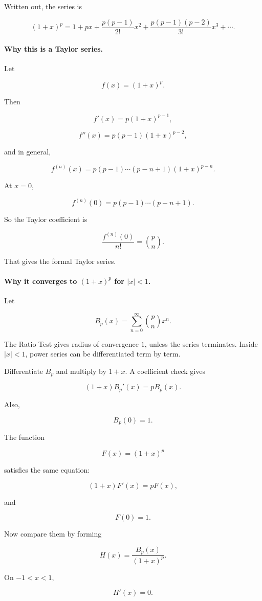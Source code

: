 Written out, the series is

\[
\boxed{
(1+x)^p
=
1+px+\frac{p(p-1)}{2!}x^2
+\frac{p(p-1)(p-2)}{3!}x^3+\cdots.
}
\]

\paragraph{Why this is a Taylor series.}
Let

\[
f(x)=(1+x)^p.
\]

Then

\[
f'(x)=p(1+x)^{p-1},
\]

\[
f''(x)=p(p-1)(1+x)^{p-2},
\]

and in general,

\[
f^{(n)}(x)=p(p-1)\cdots(p-n+1)(1+x)^{p-n}.
\]

At \(x=0\),

\[
f^{(n)}(0)=p(p-1)\cdots(p-n+1).
\]

So the Taylor coefficient is

\[
\frac{f^{(n)}(0)}{n!}
=
\binom{p}{n}.
\]

That gives the formal Taylor series.

\paragraph{Why it converges to \((1+x)^p\) for \(|x|<1\).}
Let

\[
B_p(x)=\sum_{n=0}^{\infty}\binom{p}{n}x^n.
\]

The Ratio Test gives radius of convergence \(1\), unless the series terminates.  Inside
\(|x|<1\), power series can be differentiated term by term.

Differentiate \(B_p\) and multiply by \(1+x\).  A coefficient check gives

\[
(1+x)B_p'(x)=pB_p(x).
\]

Also,

\[
B_p(0)=1.
\]

The function

\[
F(x)=(1+x)^p
\]

satisfies the same equation:

\[
(1+x)F'(x)=pF(x),
\]

and

\[
F(0)=1.
\]

Now compare them by forming

\[
H(x)=\frac{B_p(x)}{(1+x)^p}.
\]

On \(-1<x<1\),

\[
H'(x)=0.
\]

